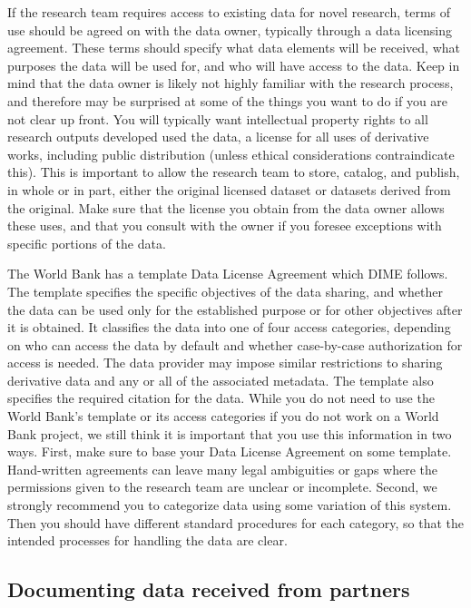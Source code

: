 \documentclass[
]{book}
\begin{document}
If the research team requires access to existing data for novel research,
terms of use should be agreed on with the data owner,
typically through a data licensing agreement.
These terms should specify what data elements will be received,
what purposes the data will be used for, and who will have access to the data.
Keep in mind that the data owner is likely not highly familiar
with the research process, and therefore may be surprised
at some of the things you want to do if you are not clear up front.
You will typically want intellectual property rights to all research outputs developed used the data,
a license for all uses of derivative works, including public distribution
(unless ethical considerations contraindicate this).
This is important to allow the research team to store, catalog, and publish, in whole or in part,
either the original licensed dataset or datasets derived from the original.
Make sure that the license you obtain from the data owner allows these uses,
and that you consult with the owner
if you foresee exceptions with specific portions of the data.

The World Bank has a template Data License Agreement which DIME follows.
The template specifies the specific objectives of the data sharing,
and whether the data can be used only for the established purpose
or for other objectives after it is obtained.
It classifies the data into one of four access categories,
depending on who can access the data by default
and whether case-by-case authorization for access is needed.
The data provider may impose similar restrictions
to sharing derivative data and any or all of the associated metadata.
The template also specifies the required citation for the data.
While you do not need to use the World Bank's template
or its access categories if you do not work on a World Bank project,
we still think it is important that you use this information in two ways.
First, make sure to base your Data License Agreement on some template.
Hand-written agreements can leave many legal ambiguities or gaps
where the permissions given to the research team are unclear or incomplete.
Second, we strongly recommend you to categorize data using some variation of this system.
Then you should have different standard procedures for each category,
so that the intended processes for handling the data are clear.

\hypertarget{documenting-data-received-from-partners}{%
\subsection*{Documenting data received from partners}\label{documenting-data-received-from-partners}}
\end{document}
